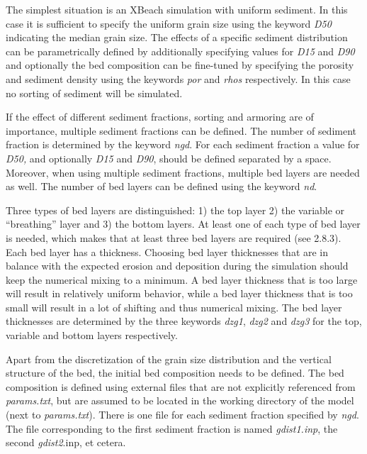 \documentclass{article}
\begin{document}
\noindent The simplest situation is an XBeach simulation with uniform sediment. In this case it is sufficient to specify the uniform grain size using the keyword \textit{D50} indicating the median grain size. The effects of a specific sediment distribution can be parametrically defined by additionally specifying values for \textit{D15 }and \textit{D90} and optionally the bed composition can be fine-tuned by specifying the porosity and sediment density using the keywords \textit{por} and \textit{rhos }respectively. In this case no sorting of sediment will be simulated.

\noindent If the effect of different sediment fractions, sorting and armoring are of importance, multiple sediment fractions can be defined. The number of sediment fraction is determined by the keyword \textit{ngd}. For each sediment fraction a value for \textit{D50,} and optionally \textit{D15} and \textit{D90}, should be defined separated by a space. Moreover, when using multiple sediment fractions, multiple bed layers are needed as well. The number of bed layers can be defined using the keyword \textit{nd}. 

\noindent Three types of bed layers are distinguished: 1) the top layer 2) the variable or ``breathing'' layer and 3) the bottom layers. At least one of each type of bed layer is needed, which makes that at least three bed layers are required (see 2.8.3). Each bed layer has a thickness. Choosing bed layer thicknesses that are in balance with the expected erosion and deposition during the simulation should keep the numerical mixing to a minimum. A bed layer thickness that is too large will result in relatively uniform behavior, while a bed layer thickness that is too small will result in a lot of shifting and thus numerical mixing. The bed layer thicknesses are determined by the three keywords \textit{dzg1}, \textit{dzg2} and \textit{dzg3} for the top, variable and bottom layers respectively.

\noindent Apart from the discretization of the grain size distribution and the vertical structure of the bed, the initial bed composition needs to be defined. The bed composition is defined using external files that are not explicitly referenced from \textit{params.txt}, but are assumed to be located in the working directory of the model (next to \textit{params.txt}). There is one file for each sediment fraction specified by \textit{ngd}. The file corresponding to the first sediment fraction is named \textit{gdist1.inp}, the second \textit{gdist2}.inp, et cetera.
\end{document}
